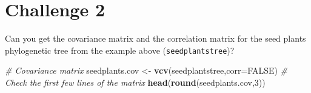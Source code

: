 \documentclass[
]{book}
\newenvironment{Shaded}{\begin{snugshade}}{\end{snugshade}}
\newcommand{\AttributeTok}[1]{\textcolor[rgb]{0.13,0.29,0.53}{#1}}
\newcommand{\CommentTok}[1]{\textcolor[rgb]{0.56,0.35,0.01}{\textit{#1}}}
\newcommand{\ConstantTok}[1]{\textcolor[rgb]{0.56,0.35,0.01}{#1}}
\newcommand{\DecValTok}[1]{\textcolor[rgb]{0.00,0.00,0.81}{#1}}
\newcommand{\FunctionTok}[1]{\textcolor[rgb]{0.13,0.29,0.53}{\textbf{#1}}}
\newcommand{\NormalTok}[1]{#1}
\newcommand{\OtherTok}[1]{\textcolor[rgb]{0.56,0.35,0.01}{#1}}
\begin{document}
\section{Challenge 2}\label{challenge-2-1}

Can you get the covariance matrix and the correlation matrix for the seed plants phylogenetic tree from the example above (\texttt{seedplantstree})?

\begin{Shaded}
\begin{Highlighting}[]
\CommentTok{\# Covariance matrix}
\NormalTok{seedplants.cov }\OtherTok{\textless{}{-}} \FunctionTok{vcv}\NormalTok{(seedplantstree,}\AttributeTok{corr=}\ConstantTok{FALSE}\NormalTok{)}
\CommentTok{\# Check the first few lines of the matrix}
\FunctionTok{head}\NormalTok{(}\FunctionTok{round}\NormalTok{(seedplants.cov,}\DecValTok{3}\NormalTok{))}
\end{Highlighting}
\end{Shaded}
\end{document}
